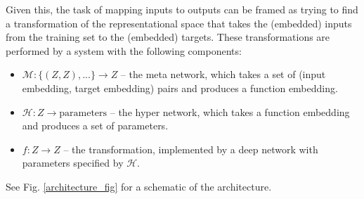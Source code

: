\documentclass{article}
\begin{document}
Given this, the task of mapping inputs to outputs can be framed as trying to find a transformation of the representational space that takes the (embedded) inputs from the training set to the (embedded) targets. These transformations are performed by a system with the following components:  
\begin{itemize}
\item $\mathcal{M}: \{(Z, Z), ...\} \rightarrow Z $ -- the meta network, which takes a set of (input embedding, target embedding) pairs and produces a function embedding. 
\item $\mathcal{H}: Z \rightarrow \text{parameters}$ -- the hyper network, which takes a function embedding and produces a set of parameters. 
\item $f: Z \rightarrow Z$ -- the transformation, implemented by a deep network with parameters specified by $\mathcal{H}$.
\end{itemize}
See Fig. \ref{architecture_fig} for a schematic of the architecture. \par 
\end{document}
